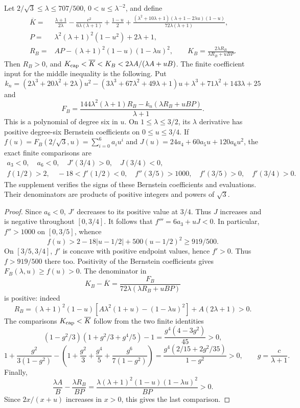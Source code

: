 \begin{lemma}\label{lem:near-cap-arithmetic}
Let $2/\sqrt3\le\lambda\le707/500$, $0<u\le\lambda^{-2}$, and define
\[
\begin{split}
 \overline K={}&\frac{\lambda+1}{2\lambda}-\frac{c^2}{6\lambda(\lambda+1)}
 +\frac{1-u}{2}
 +\frac{(\lambda^2+10\lambda+1)(\lambda+1-2\lambda u)(1-u)}{72\lambda(\lambda+1)},\\
 P={}&\lambda^2(\lambda+1)^2(1-u^2)+2\lambda+1,\\
 R_B={}&AP-(\lambda+1)^2(1-u)(1-\lambda u)^2,\qquad
 K_B=\frac{2\lambda R_B}{\lambda R_B+uBP}.
\end{split}
\]
Then $R_B>0$, and $K_{\rm cap}<\overline K<K_B<2\lambda A/(\lambda A+uB)$.
The finite coefficient input for the middle inequality is the following. Put
\[
 k_n=(2\lambda^3+20\lambda^2+2\lambda)u^2
 -(3\lambda^3+67\lambda^2+49\lambda+1)u
 +\lambda^3+71\lambda^2+143\lambda+25
\]
and
\[
 F_B=\frac{144\lambda^2(\lambda+1)R_B-k_n(\lambda R_B+uBP)}{\lambda+1}.
\]
This is a polynomial of degree six in $u$. On $1\le\lambda\le3/2$, its $\lambda$ derivative has positive degree-six Bernstein coefficients on $0\le u\le3/4$. If $f(u)=F_B(2/\sqrt3,u)=\sum_{i=0}^6a_i u^i$ and $J(u)=24a_4+60a_5u+120a_6u^2$, the exact finite comparisons are
\[
\begin{gathered}
 a_3<0,\quad a_6<0,\quad J'(3/4)>0,\quad J(3/4)<0,\\
 f(1/2)>2,\quad -18<f'(1/2)<0,\quad f''(3/5)>1000,\quad
 f'(3/5)>0,\quad f'(3/4)>0.
\end{gathered}
\]
The supplement verifies the signs of these Bernstein coefficients and evaluations. Their denominators are products of positive integers and powers of $\sqrt3$.
\end{lemma}
\begin{proof}
Since $a_6<0$, $J'$ decreases to its positive value at $3/4$. Thus $J$ increases and is negative throughout $[0,3/4]$. It follows that $f'''=6a_3+uJ<0$. In particular, $f''>1000$ on $[0,3/5]$, whence
\[
 f(u)>2-18|u-1/2|+500(u-1/2)^2\ge919/500.
\]
On $[3/5,3/4]$, $f'$ is concave with positive endpoint values, hence $f'>0$. Thus $f>919/500$ there too. Positivity of the Bernstein coefficients gives $F_B(\lambda,u)\ge f(u)>0$. The denominator in
\[
 K_B-\overline K=\frac{F_B}{72\lambda(\lambda R_B+uBP)}
\]
is positive: indeed
\[
 R_B=(\lambda+1)^2(1-u)[A\lambda^2(1+u)-(1-\lambda u)^2]+A(2\lambda+1)>0.
\]
The comparisons $K_{\rm cap}<\overline K$ follow from the two finite identities
\[
 (1-g^2/3)(1+g^2/3+g^4/5)-1=\frac{g^4(4-3g^2)}{45}>0,
\]
\[
 1+\frac{g^2}{3(1-g^2)}-\left(1+\frac{g^2}3+\frac{g^4}5+
                  \frac{g^6}{7(1-g^2)}\right)
 =\frac{g^4(2/15+2g^2/35)}{1-g^2}>0,
 \qquad g=\frac c{\lambda+1}.
\]
Finally,
\[
 \frac{\lambda A}{B}-\frac{\lambda R_B}{BP}
 =\frac{\lambda(\lambda+1)^2(1-u)(1-\lambda u)^2}{BP}>0.
\]
Since $2x/(x+u)$ increases in $x>0$, this gives the last comparison.
\end{proof}


